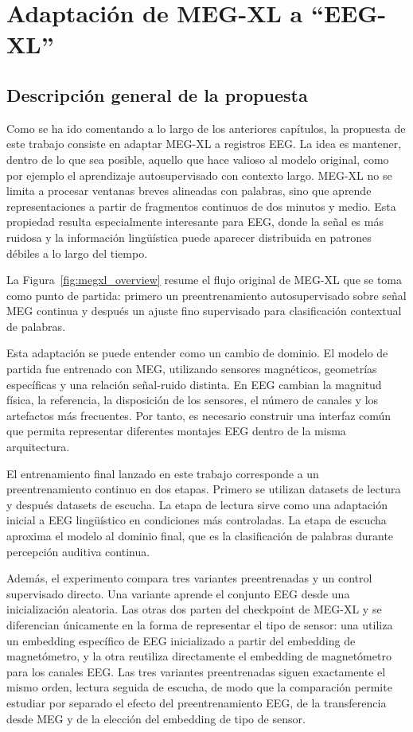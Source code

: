 \chapter{Adaptación de MEG-XL a ``EEG-XL''}
\providecommand{\codepath}[1]{\nolinkurl{#1}}

\section{Descripción general de la propuesta}

Como se ha ido comentando a lo largo de los anteriores capítulos, la propuesta de este trabajo consiste en adaptar MEG-XL a registros EEG. La idea es mantener, dentro de lo que sea posible, aquello que hace valioso al modelo original, como por ejemplo el aprendizaje autosupervisado con contexto largo. MEG-XL no se limita a procesar ventanas breves alineadas con palabras, sino que aprende representaciones a partir de fragmentos continuos de dos minutos y medio. Esta propiedad resulta especialmente interesante para EEG, donde la señal es más ruidosa y la información lingüística puede aparecer distribuida en patrones débiles a lo largo del tiempo.

La Figura~\ref{fig:megxl_overview} resume el flujo original de MEG-XL que se toma como punto de partida: primero un preentrenamiento autosupervisado sobre señal MEG continua y después un ajuste fino supervisado para clasificación contextual de palabras.



Esta adaptación se puede entender como un cambio de dominio. El modelo de partida fue entrenado con MEG, utilizando sensores magnéticos, geometrías específicas y una relación señal-ruido distinta. En EEG cambian la magnitud física, la referencia, la disposición de los sensores, el número de canales y los artefactos más frecuentes. Por tanto, es necesario construir una interfaz común que permita representar diferentes montajes EEG dentro de la misma arquitectura.

El entrenamiento final lanzado en este trabajo corresponde a un preentrenamiento continuo en dos etapas. Primero se utilizan datasets de lectura y después datasets de escucha. La etapa de lectura sirve como una adaptación inicial a EEG lingüístico en condiciones más controladas. La etapa de escucha aproxima el modelo al dominio final, que es la clasificación de palabras durante percepción auditiva continua.

Además, el experimento compara tres variantes preentrenadas y un control supervisado directo. Una variante aprende el conjunto EEG desde una inicialización aleatoria. Las otras dos parten del checkpoint de MEG-XL y se diferencian únicamente en la forma de representar el tipo de sensor: una utiliza un embedding específico de EEG inicializado a partir del embedding de magnetómetro, y la otra reutiliza directamente el embedding de magnetómetro para los canales EEG. Las tres variantes preentrenadas siguen exactamente el mismo orden, lectura seguida de escucha, de modo que la comparación permite estudiar por separado el efecto del preentrenamiento EEG, de la transferencia desde MEG y de la elección del embedding de tipo de sensor.

